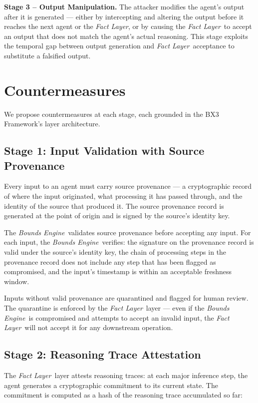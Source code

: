 \documentclass[12pt]{article}
\newcommand{\bounds}{\textit{Bounds Engine}}
\newcommand{\fact}{\textit{Fact Layer}}
\begin{document}
\medskip\noindent\textbf{Stage 3 -- Output Manipulation.}
The attacker modifies the agent's output after it is generated --- either by intercepting and altering the output before it reaches the next agent or the \fact, or by causing the \fact\ to accept an output that does not match the agent's actual reasoning. This stage exploits the temporal gap between output generation and \fact\ acceptance to substitute a falsified output.

\section{Countermeasures}
\label{sec:countermeasures}

We propose countermeasures at each stage, each grounded in the BX3 Framework's layer architecture.

\subsection{Stage 1: Input Validation with Source Provenance}

Every input to an agent must carry source provenance --- a cryptographic record of where the input originated, what processing it has passed through, and the identity of the source that produced it. The source provenance record is generated at the point of origin and is signed by the source's identity key.

The \bounds\ validates source provenance before accepting any input. For each input, the \bounds\ verifies: the signature on the provenance record is valid under the source's identity key, the chain of processing steps in the provenance record does not include any step that has been flagged as compromised, and the input's timestamp is within an acceptable freshness window.

Inputs without valid provenance are quarantined and flagged for human review. The quarantine is enforced by the \fact\ layer --- even if the \bounds\ is compromised and attempts to accept an invalid input, the \fact\ will not accept it for any downstream operation.

\subsection{Stage 2: Reasoning Trace Attestation}

The \fact\ layer attests reasoning traces: at each major inference step, the agent generates a cryptographic commitment to its current state. The commitment is computed as a hash of the reasoning trace accumulated so far:
\end{document}
